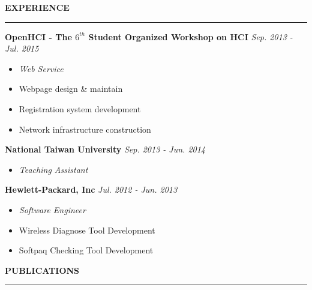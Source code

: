 \documentclass[11pt,letterpaper]{article}
\begin{document}
%
%

\vspace{1em}
\noindent
\MakeUppercase{\bf Experience}
\vspace{0.5em}
\hrule

%
\noindent \hspace{1.2em}
{\bf OpenHCI - The $6^{th}$ Student Organized Workshop on HCI} \hfill {\em Sep. 2013 - Jul. 2015}
\vspace{-0.5em}
\begin{itemize}[leftmargin=1.5em] \item[] {\em Web Service} \end{itemize}
\vspace{-0.5em}
\begin{itemize}[leftmargin=1.5em]
	\itemsep=-0.5em
	\item[] Webpage design \& maintain
	\item[] Registration system development
	\item[] Network infrastructure construction
\end{itemize}

%
\noindent \hspace{1.2em}
{\bf National Taiwan University} \hfill {\em Sep. 2013 - Jun. 2014}
\vspace{-0.5em}
\begin{itemize}[leftmargin=1.5em] \item[] {\em Teaching Assistant} \end{itemize}

%
\noindent \hspace{1.2em}
{\bf Hewlett-Packard, Inc} \hfill {\em Jul. 2012 - Jun. 2013}
\vspace{-0.5em}
\begin{itemize}[leftmargin=1.5em] \item[] {\em Software Engineer} \end{itemize}
\vspace{-0.5em}
\begin{itemize}[leftmargin=1.5em]
	\itemsep=-0.5em
	\item[] Wireless Diagnose Tool Development
	\item[] Softpaq Checking Tool Development
\end{itemize}


%
%

\vspace{1em}
\noindent
\MakeUppercase{\bf Publications}
\vspace{0.5em}
\hrule
\end{document}
